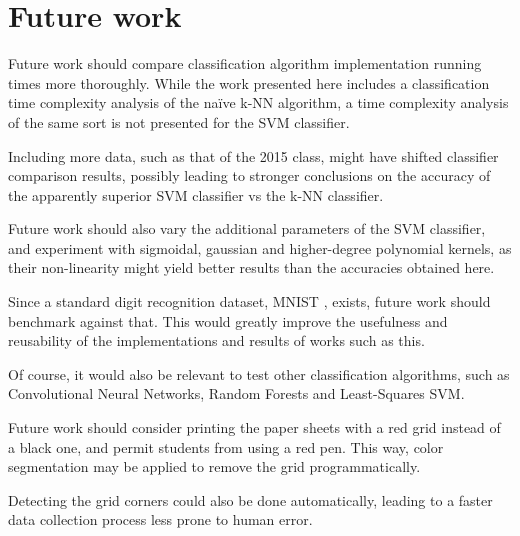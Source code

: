 \section{Future work}
Future work should compare classification algorithm implementation
running times more thoroughly.
While the work presented here includes a classification time
complexity analysis of the naïve k-NN algorithm,
a time complexity analysis of the same sort is not presented for the SVM classifier.

Including more data, such as that of the 2015 class,
might have shifted classifier comparison results,
possibly leading to stronger conclusions on
the accuracy of the apparently superior SVM classifier
vs the k-NN classifier.

Future work should also vary the additional parameters of the SVM
classifier, and experiment with sigmoidal, gaussian and higher-degree polynomial
kernels, as their non-linearity might yield better results
than the accuracies obtained here.

Since a standard digit recognition dataset, MNIST \citep{mnist}, exists,
future work should benchmark against that.
This would greatly improve the usefulness
and reusability of the implementations and results
of works such as this.

Of course, it would also be relevant to test other
classification algorithms, such as Convolutional Neural Networks,
Random Forests and Least-Squares SVM.

Future work should consider printing the paper
sheets with a red grid instead of a black one,
and permit students from using a red pen.
This way, color segmentation may be applied
to remove the grid programmatically.

Detecting the grid corners could also be done
automatically, leading to a faster data collection process
less prone to human error.
